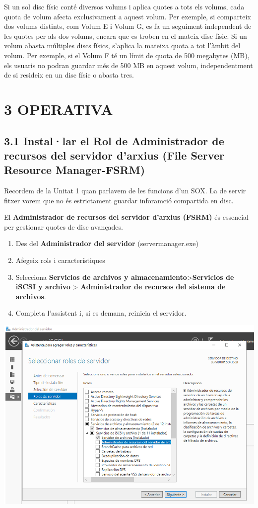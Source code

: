 \documentclass[
  a4paper,
]{article}
\providecommand{\tightlist}{%
  \setlength{\itemsep}{0pt}\setlength{\parskip}{0pt}}
\begin{document}
Si un sol disc físic conté diversos volums i aplica quotes a tots els
volums, cada quota de volum afecta exclusivament a aquest volum. Per
exemple, si comparteix dos volums distints, com Volum E i Volum G, es fa
un seguiment independent de les quotes per als dos volums, encara que es
troben en el mateix disc físic. Si un volum abasta múltiples discs
físics, s'aplica la mateixa quota a tot l'àmbit del volum. Per exemple,
si el Volum F té un límit de quota de 500 megabytes (MB), els usuaris no
podran guardar més de 500 MB en aquest volum, independentment de si
resideix en un disc físic o abasta tres.

\section{3 OPERATIVA}\label{operativa}

\subsection{3.1 Instal·lar el Rol de Administrador de recursos del
servidor d'arxius (File Server Resource
Manager-FSRM)}\label{installar-el-rol-de-administrador-de-recursos-del-servidor-darxius-file-server-resource-manager-fsrm}

Recordem de la Unitat 1 quan parlavem de les funcions d'un SOX. La de
servir fitxer vorem que no és estrictament guardar inforamció compartida
en disc.

El \textbf{Administrador de recursos del servidor d'arxius (FSRM)} és
essencial per gestionar quotes de disc avançades.

\begin{enumerate}
\def\labelenumi{\arabic{enumi}.}
\tightlist
\item
  Des del \textbf{Administrador del servidor} (servermanager.exe)
\item
  Afegeix rols i característiques
\item
  Selecciona \textbf{Servicios de archivos y
  almacenamiento}\textgreater{}\textbf{Servicios de iSCSI y archivo}
  \textgreater{} \textbf{Administrador de recursos del sistema de
  archivos}.
\item
  Completa l'assistent i, si es demana, reinicia el servidor.
\end{enumerate}

\includegraphics{png/instalaROL.png}
\end{document}
